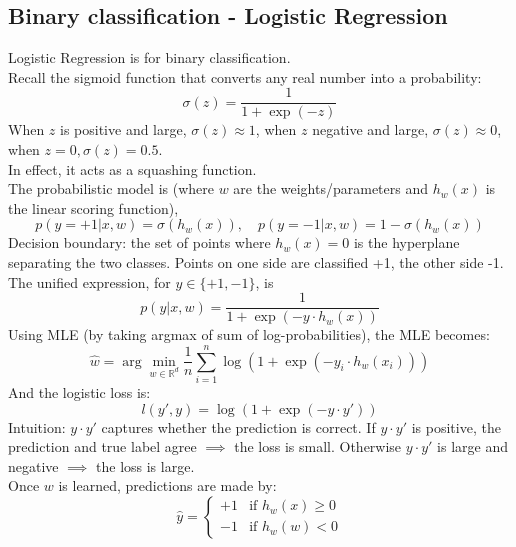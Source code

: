 \documentclass[../Probability.tex]{subfiles}
\begin{document}
\subsection{Binary classification - Logistic Regression}
Logistic Regression is for binary classification.\\
Recall the sigmoid function that converts any real number into a probability:
$$\sigma(z) = \frac{1}{1 + \exp(-z)}$$
When $z$ is positive and large, $\sigma(z)\approx 1$, when $z$ negative and large, $\sigma(z)\approx 0$, when $z=0, \sigma(z)=0.5$.\\
In effect, it acts as a squashing function.\\
The probabilistic model is (where $w$ are the weights/parameters and $h_w(x)$ is the linear scoring function),
$$p(y = +1|x, w) = \sigma(h_w(x)), \quad p(y = -1|x, w) = 1 - \sigma(h_w(x))$$
Decision boundary: the set of points where $h_w(x)=0$ is the hyperplane separating the two classes. Points on one side are classified +1, the other side -1.\\
The unified expression, for $y\in \{+1, -1\}$, is
$$p(y|x,w) = \frac{1}{1 + \exp(-y\cdot h_w(x))}$$
Using MLE (by taking argmax of sum of log-probabilities), the MLE becomes:
$$\hat{w} = \arg\min_{w \in \mathbb{R}^d} \frac{1}{n} \sum_{i=1}^{n} \log(1 + \exp(-y_i \cdot h_w(x_i)))$$
And the logistic loss is:
$$l(y', y) = \log(1 + \exp(-y \cdot y'))$$
Intuition: $y\cdot y'$ captures whether the prediction is correct. If $y\cdot y'$ is positive, the prediction and true label agree $\implies$ the loss is small. Otherwise $y\cdot y'$ is large and negative $\implies$ the loss is large.\\
Once $w$ is learned, predictions are made by:
$$\hat{y} = \begin{cases}
    +1 & \text{if } h_w(x) \ge 0 \\
    -1 & \text{if } h_w(w) < 0
\end{cases}$$
\end{document}
